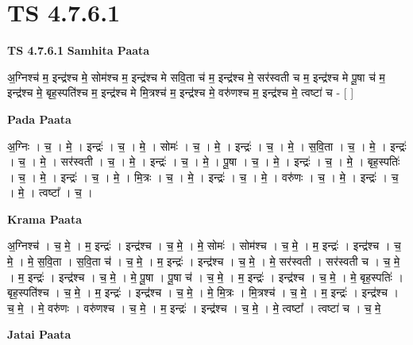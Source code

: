 \documentclass[17pt]{extarticle}
\begin{document}
\section{ TS 4.7.6.1 }

\textbf{TS 4.7.6.1 } \newline
\textbf{Samhita Paata} \newline

अ॒ग्निश्च॑ म॒ इन्द्र॑श्च मे॒ सोम॑श्च म॒ इन्द्र॑श्च मे सवि॒ता च॑ म॒ इन्द्र॑श्च मे॒ सर॑स्वती च म॒ इन्द्र॑श्च मे पू॒षा च॑ म॒ इन्द्र॑श्च मे॒ बृह॒स्पति॑श्च म॒ इन्द्र॑श्च मे मि॒त्रश्च॑ म॒ इन्द्र॑श्च मे॒ वरु॑णश्च म॒ इन्द्र॑श्च मे॒ त्वष्टा॑ च - [  ] \newline

\textbf{Pada Paata} \newline

अ॒ग्निः । च॒ । मे॒ । इन्द्रः॑ । च॒ । मे॒ । सोमः॑ । च॒ । मे॒ । इन्द्रः॑ । च॒ । मे॒ । स॒वि॒ता । च॒ । मे॒ । इन्द्रः॑ । च॒ । मे॒ । सर॑स्वती । च॒ । मे॒ । इन्द्रः॑ । च॒ । मे॒ । पू॒षा । च॒ । मे॒ । इन्द्रः॑ । च॒ । मे॒ । बृह॒स्पतिः॑ । च॒ । मे॒ । इन्द्रः॑ । च॒ । मे॒ । मि॒त्रः । च॒ । मे॒ । इन्द्रः॑ । च॒ । मे॒ । वरु॑णः । च॒ । मे॒ । इन्द्रः॑ । च॒ । मे॒ । त्वष्टा᳚ । च॒ ।  \newline


\textbf{Krama Paata} \newline

अ॒ग्निश्च॑ । च॒ मे॒ । म॒ इन्द्रः॑ । इन्द्र॑श्च । च॒ मे॒ । मे॒ सोमः॑ । सोम॑श्च । च॒ मे॒ । म॒ इन्द्रः॑ । इन्द्र॑श्च । च॒ मे॒ । मे॒ स॒वि॒ता । स॒वि॒ता च॑ । च॒ मे॒ । म॒ इन्द्रः॑ । इन्द्र॑श्च । च॒ मे॒ । मे॒ सर॑स्वती । सर॑स्वती च । च॒ मे॒ । म॒ इन्द्रः॑ । इन्द्र॑श्च । च॒ मे॒ । मे॒ पू॒षा । पू॒षा च॑ । च॒ मे॒ । म॒ इन्द्रः॑ । इन्द्र॑श्च । च॒ मे॒ । मे॒ बृह॒स्पतिः॑ । बृह॒स्पति॑श्च । च॒ मे॒ । म॒ इन्द्रः॑ । इन्द्र॑श्च । च॒ मे॒ । मे॒ मि॒त्रः । मि॒त्रश्च॑ । च॒ मे॒ । म॒ इन्द्रः॑ । इन्द्र॑श्च । च॒ मे॒ । मे॒ वरु॑णः । वरु॑णश्च । च॒ मे॒ । म॒ इन्द्रः॑ । इन्द्र॑श्च । च॒ मे॒ । मे॒ त्वष्टा᳚ । त्वष्टा॑ च । च॒ मे॒ \newline

\textbf{Jatai Paata} \newline
\end{document}
